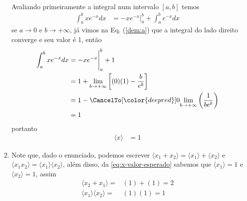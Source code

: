 \begin{prob}
\begin{sol}
\begin{enumerate}[label=\alph *)]
\begin{definition}
\begin{align}
					\end{align}
				\end{definition}
				Avaliando primeiramente a integral num intervalo $[a,b]$ temos
				\begin{align}
					\int_{a}^{b}xe^{-x}dx & =-xe^{-x}\Biggr |_a^b+\int_{a}^{b}e^{-x}dx
					\label{eq:x-valor-esperado}
				\end{align}
				se $a\to 0$ e $b\to +\infty$, já vimos na Eq. (\ref{dem:a}) que a integral do lado direito converge e seu valor é 1, então
				\begin{align}
					\int_a^b xe^{-x}dx & =-xe^{-x}\Biggr |_a^{b}+1\nonumber\\
                  	& =1+\lim _{b\to +\infty}\left[(0)(1)-\frac{b}{e^{b}}\right]\nonumber\\
                  	& =1-\CancelTo[\color{deepred}]{0}{\lim _{b\to +\infty}\left(\frac{1}{be^b}\right)}\nonumber\\
                  	& =1
				\end{align}
				portanto
				\begin{align}
					\langle x\rangle & =1
				\end{align}
				\item Note que, dado o enunciado, podemos escrever $\langle x_1+x_2 \rangle=\langle x_1\rangle+\langle x_2\rangle$ e $\langle x_1x_2\rangle=\langle x_1\rangle\langle x_2\rangle$, além disso, da \autoref{eq:x-valor-esperado} sabemos  que $\langle x_1\rangle=1$ e $\langle x_2\rangle=1$, assim
				\begin{align}
					\langle x_2+x_1\rangle=&(1)+(1)=2\\
					\langle x_1\rangle\langle x_2\rangle=& (1)(1)=1
				\end{align}
		\end{enumerate}
	\end{sol}
\end{prob}

